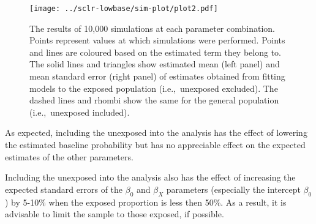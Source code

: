 \begin{figure}[htp]
	\centering
	\texttt{[image: ../sclr-lowbase/sim-plot/plot2.pdf]}
	\caption{
		The results of 10,000 simulations at each parameter combination. Points represent values at which simulations were performed. Points and lines are coloured based on the estimated term they belong to. The solid lines and triangles show estimated mean (left panel) and mean standard error (right panel) of estimates obtained from fitting models to the exposed population (i.e.,~unexposed excluded). The dashed lines and rhombi show the same for the general population (i.e.,~unexposed included).
	}
	\label{fig:sclr-lowbase}
\end{figure}

As expected, including the unexposed into the analysis has the effect of lowering the estimated baseline probability but has no appreciable effect on the expected estimates of the other parameters.

Including the unexposed into the analysis also has the effect of increasing the expected standard errors of the \(\beta_0\) and $\beta_X$ parameters (especially the intercept \(\beta_0\)) by 5-10\% when the exposed proportion is less then 50\%. As a result, it is advisable to limit the sample to those exposed, if possible.
